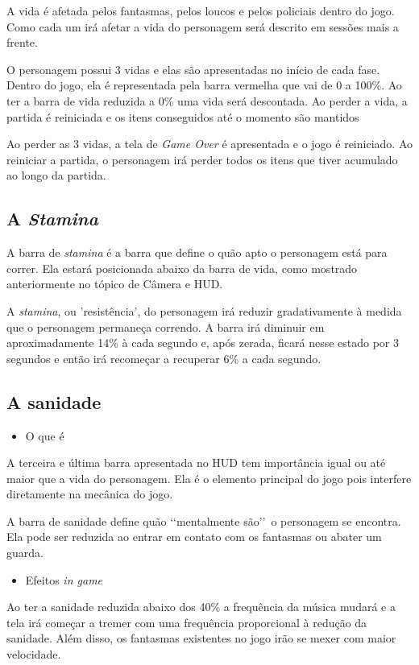 \documentclass{article}
\begin{document}
A vida é afetada pelos fantasmas, pelos loucos e pelos policiais dentro do jogo. Como cada um irá afetar a vida do personagem será descrito em sessões mais a frente.

O personagem possui 3 vidas e elas são apresentadas no início de cada fase. Dentro do jogo, ela é representada pela barra vermelha que vai de 0 a 100\%. Ao ter a barra de vida reduzida a 0\% uma vida será descontada. Ao perder a vida, a partida é reiniciada e os itens conseguidos até o momento são mantidos

Ao perder as 3 vidas, a tela de \textit{Game Over} é apresentada e o jogo é reiniciado. Ao reiniciar a partida, o personagem irá perder todos os itens que tiver acumulado ao longo da partida.

\subsection{A \textit{Stamina}}
A barra de \textit{stamina} é a barra que define o quão apto o personagem está para correr. Ela estará posicionada abaixo da barra de vida, como mostrado anteriormente no tópico de Câmera e HUD.

A \textit{stamina}, ou 'resistência', do personagem irá reduzir gradativamente à medida que o personagem permaneça correndo. A barra irá diminuir em aproximadamente 14\% à cada segundo e, após zerada, ficará nesse estado por 3 segundos e então irá recomeçar a recuperar 6\% a cada segundo.

\subsection{A sanidade}
\begin{itemize}
\item O que é
\end{itemize}
A terceira e última barra apresentada no HUD tem importância igual ou até maior que a vida do personagem. Ela é o elemento principal do jogo pois interfere diretamente na mecânica do jogo. 

A barra de sanidade define quão \lq\lq mentalmente são\rq\rq\ o personagem se encontra. Ela pode ser reduzida ao entrar em contato com os fantasmas ou abater um guarda. 

\begin{itemize}
\item Efeitos \textit{in game}
\end{itemize}
Ao ter a sanidade reduzida abaixo dos 40\% a frequência da música mudará e a tela irá começar a tremer com uma frequência proporcional à redução da sanidade. Além disso, os fantasmas existentes no jogo irão se mexer com maior velocidade.
\end{document}
